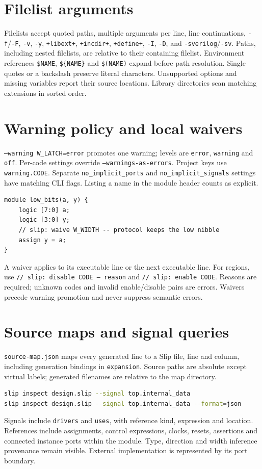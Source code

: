 \documentclass[lang=en,11pt]{elegantbook}
\newcommand{\code}[1]{\texttt{#1}}
\begin{document}
\section{Filelist arguments}
Filelists accept quoted paths, multiple arguments per line, line continuations,
\code{-f}/\code{-F}, \code{-v}, \code{-y}, \code{+libext+}, \code{+incdir+},
\code{+define+}, \code{-I}, \code{-D}, and \code{-sverilog}/\code{-sv}.
Paths, including nested filelists, are relative to their containing filelist.
Environment references \code{\$NAME}, \code{\$\{NAME\}} and \code{\$(NAME)}
expand before path resolution. Single quotes or a backslash preserve literal
characters. Unsupported options and missing variables report their source
locations. Library directories scan matching extensions in sorted order.

\section{Warning policy and local waivers}
\code{--warning W\_LATCH=error} promotes one warning; levels are
\code{error}, \code{warning} and \code{off}. Per-code settings override
\code{--warnings-as-errors}. Project keys use \code{warning.CODE}.
Separate \code{no\_implicit\_ports} and \code{no\_implicit\_signals} settings
have matching CLI flags. Listing a name in the module header counts as explicit.
\begin{lstlisting}[language=Slip]
module low_bits(a, y) {
    logic [7:0] a;
    logic [3:0] y;
    // slip: waive W_WIDTH -- protocol keeps the low nibble
    assign y = a;
}
\end{lstlisting}
A waiver applies to its executable line or the next executable line. For regions,
use \code{// slip: disable CODE -- reason} and \code{// slip: enable CODE}.
Reasons are required; unknown codes and invalid enable/disable pairs are errors.
Waivers precede warning promotion and never suppress semantic errors.

\section{Source maps and signal queries}
\code{source-map.json} maps every generated line to a Slip file, line and column,
including generation bindings in \code{expansion}. Source paths are absolute
except virtual labels; generated filenames are relative to the map directory.
\begin{lstlisting}[language=bash]
slip inspect design.slip --signal top.internal_data
slip inspect design.slip --signal top.internal_data --format=json
\end{lstlisting}
Signals include \code{drivers} and \code{uses}, with reference kind, expression
and location. References include assignments, control expressions, clocks,
resets, assertions and connected instance ports within the module. Type,
direction and width inference provenance remain visible. External implementation
is represented by its port boundary.
\end{document}
